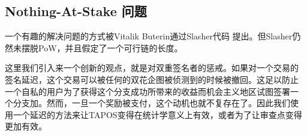 \documentclass[letterpaper]{article}
\begin{document}

\subsection{Nothing-At-Stake 问题}
一个有趣的解决问题的方式被Vitalik Buterin通过Slasher\cite{Slasher}代码
提出。但Slasher仍然未摆脱PoW，并且假定了一个可行链的长度。

这里我们引入来一个创新的观点，就是对双重签名者的惩戒。如果对一个交易的
签名延迟，这个交易可以被任何的双花企图被侦测到的时候被撤回。这足以防止
一个自私的用户为了获得这个分支成功所带来的收益而机会主义地区试图签署一
个分支加。然而，一旦一个奖励被支付，这个动机也就不复存在了。因此我们使
用一个延迟的方法来让TAPOS变得在统计学意义上有效，或者为了让审查点变得
更加有效。
\end{document}
